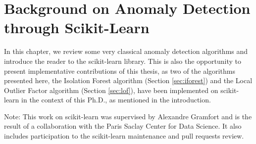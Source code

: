 \chapter{Background on Anomaly Detection through Scikit-Learn}
\label{back:AD_scikit}
\begin{chapabstract}
In this chapter, we review some very classical anomaly detection algorithms and introduce the reader to the scikit-learn library. This is also the opportunity to present implementative contributions of this thesis, as two of the algorithms presented here, the Isolation Forest algorithm (Section \ref{sec:iforest}) and the Local Outlier Factor algorithm (Section \ref{sec:lof}), have been implemented on scikit-learn in the context of this Ph.D., as mentioned in the introduction.
\end{chapabstract}

Note: This work on scikit-learn was supervised by Alexandre Gramfort and is the result of a collaboration with the Paris Saclay Center for Data Science. It also includes participation to the scikit-learn maintenance and pull requests review.



